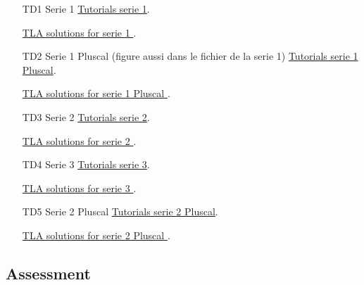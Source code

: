 \documentclass[ 12pt]{article}
\begin{document}
\begin{enumerate}



  \item[TD1]   Serie  1
    \href{http://mery54.github.io/teaching/aspd/lecturesnotes/aspd-app-td1.pdf}{Tutorials 
      serie 1}.

        \href{http://mery54.github.io/teaching/aspd/models/tlatd1.zip}{TLA 
           solutions for serie 1
         }.

\item[TD2]   Serie 1  Pluscal (figure aussi dans le fichier de la serie 1)
    \href{http://mery54.github.io/teaching/aspd/lecturesnotes/aspd-app-td1.pdf}{Tutorials 
      serie 1  Pluscal}.

        \href{http://mery54.github.io/teaching/aspd/models/tdpluscal.zip}{TLA 
           solutions for serie 1 Pluscal
         }.
         

         
\item[TD3]   Serie  2
    \href{http://mery54.github.io/teaching/aspd/lecturesnotes/aspd-app-td2.pdf}{Tutorials 
      serie 2}.

        \href{http://mery54.github.io/teaching/aspd/models/tlatd2.zip}{TLA 
           solutions for serie 2
         }.


         
\item[TD4]   Serie  3
    \href{http://mery54.github.io/teaching/aspd/lecturesnotes/aspd-app-td3.pdf}{Tutorials 
      serie 3}.

        \href{http://mery54.github.io/teaching/aspd/models/tlatd3.zip}{TLA 
           solutions for serie 3
         }.

\item[TD5]   Serie 2  Pluscal 
    \href{http://mery54.github.io/teaching/aspd/lecturesnotes/aspd-app-pluscal2.pdf}{Tutorials 
      serie 2 Pluscal}.

        \href{http://mery54.github.io/teaching/aspd/models/tdpluscal2.zip}{TLA 
           solutions for serie 2 Pluscal
         }.
                  
         \end{enumerate}

  
  
  \subsection{Assessment}
\label{sec:project}
\end{document}
